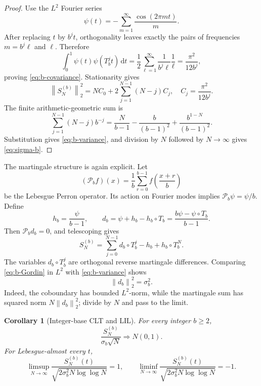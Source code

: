 \documentclass[11pt,oneside]{article}
\numberwithin{equation}{section}
\newtheorem{corollary}[theorem]{Corollary}
\theoremstyle{definition}
\theoremstyle{remark}
\newcommand{\dd}{\,\mathrm d}
\newcommand{\norm}[1]{\left\lVert#1\right\rVert}
\newcommand{\Perron}{\mathcal P}
\begin{document}
\begin{proof}
Use the \(L^2\) Fourier series
\[
 \psi(t)=-\sum_{m=1}^{\infty}\frac{\cos(2\pi mt)}m.
\]
After replacing \(t\) by \(b^jt\), orthogonality leaves exactly the pairs of frequencies
\(m=b^j\ell\) and \(\ell\).  Therefore
\[
 \int_0^1\psi(t)\psi(T_b^jt)\dd t
 =\frac12\sum_{\ell=1}^{\infty}
   \frac1{b^j\ell}\frac1\ell
 =\frac{\pi^2}{12b^j},
\]
proving \eqref{eq:b-covariance}.  Stationarity gives
\[
 \norm{S_N^{(b)}}_2^2
 =NC_0+2\sum_{j=1}^{N-1}(N-j)C_j,
 \quad C_j=\frac{\pi^2}{12b^j}.
\]
The finite arithmetic-geometric sum is
\[
 \sum_{j=1}^{N-1}(N-j)b^{-j}
 =\frac{N}{b-1}-\frac{b}{(b-1)^2}
  +\frac{b^{1-N}}{(b-1)^2}.
\]
Substitution gives \eqref{eq:b-variance}, and division by \(N\) followed by
\(N\to\infty\) gives \eqref{eq:sigma-b}.
\end{proof}

The martingale structure is again explicit.  Let
\begin{equation}
 (\Perron_bf)(x)=\frac1b\sum_{r=0}^{b-1}
 f\!\left(\frac{x+r}{b}\right)
 \label{eq:Pb}
\end{equation}
be the Lebesgue Perron operator.  Its action on Fourier modes implies
\(\Perron_b\psi=\psi/b\).  Define
\begin{equation}
 h_b=\frac{\psi}{b-1},
 \qquad
 d_b=\psi+h_b-h_b\circ T_b
 =\frac{b\psi-\psi\circ T_b}{b-1}.
 \label{eq:db}
\end{equation}
Then \(\Perron_bd_b=0\), and telescoping gives
\begin{equation}
 S_N^{(b)}
 =\sum_{j=0}^{N-1}d_b\circ T_b^j-h_b+h_b\circ T_b^N.
 \label{eq:b-Gordin}
\end{equation}
The variables \(d_b\circ T_b^j\) are orthogonal reverse martingale differences.  Comparing
\eqref{eq:b-Gordin} in \(L^2\) with \eqref{eq:b-variance} shows
\begin{equation}
 \norm{d_b}_2^2=\sigma_b^2.
 \label{eq:db-variance}
\end{equation}
Indeed, the coboundary has bounded \(L^2\)-norm, while the martingale sum has squared norm
\(N\norm{d_b}_2^2\); divide by \(N\) and pass to the limit.

\begin{corollary}[Integer-base CLT and LIL]
\label{cor:b-clt-lil}
For every integer \(b\ge2\),
\begin{equation}
 \frac{S_N^{(b)}}{\sigma_b\sqrt N}
 \Longrightarrow N(0,1).
 \label{eq:b-CLT}
\end{equation}
For Lebesgue-almost every \(t\),
\begin{equation}
 \limsup_{N\to\infty}
 \frac{S_N^{(b)}(t)}{\sqrt{2\sigma_b^2N\log\log N}}=1,
 \qquad
 \liminf_{N\to\infty}
 \frac{S_N^{(b)}(t)}{\sqrt{2\sigma_b^2N\log\log N}}=-1.
 \label{eq:b-LIL}
\end{equation}
\end{corollary}
\end{document}
